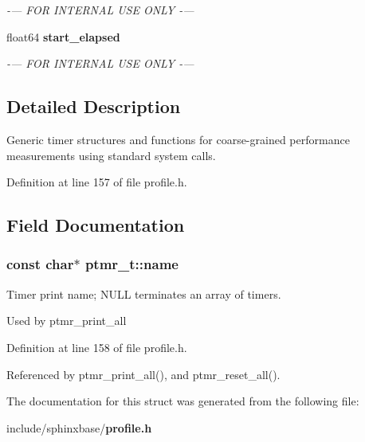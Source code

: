 \begin{DoxyCompactItemize}
\begin{DoxyCompactList}\small\item\em -\/--- F\-O\-R I\-N\-T\-E\-R\-N\-A\-L U\-S\-E O\-N\-L\-Y -\/--- \end{DoxyCompactList}\item 
float64 {\bf start\-\_\-elapsed}\label{structptmr__t_a1702b16a6c6bcb82f6c636f5e68af188}

\begin{DoxyCompactList}\small\item\em -\/--- F\-O\-R I\-N\-T\-E\-R\-N\-A\-L U\-S\-E O\-N\-L\-Y -\/--- \end{DoxyCompactList}\end{DoxyCompactItemize}


\subsection{Detailed Description}
Generic timer structures and functions for coarse-\/grained performance measurements using standard system calls. 

Definition at line 157 of file profile.\-h.



\subsection{Field Documentation}
\subsubsection[{name}]{\setlength{\rightskip}{0pt plus 5cm}const char$\ast$ ptmr\-\_\-t\-::name}\label{structptmr__t_a73b51c5a047300d77b3a82a7dcaf44f1}


Timer print name; N\-U\-L\-L terminates an array of timers. 

Used by ptmr\-\_\-print\-\_\-all 

Definition at line 158 of file profile.\-h.



Referenced by ptmr\-\_\-print\-\_\-all(), and ptmr\-\_\-reset\-\_\-all().



The documentation for this struct was generated from the following file\-:\begin{DoxyCompactItemize}
\item 
include/sphinxbase/{\bf profile.\-h}\end{DoxyCompactItemize}
